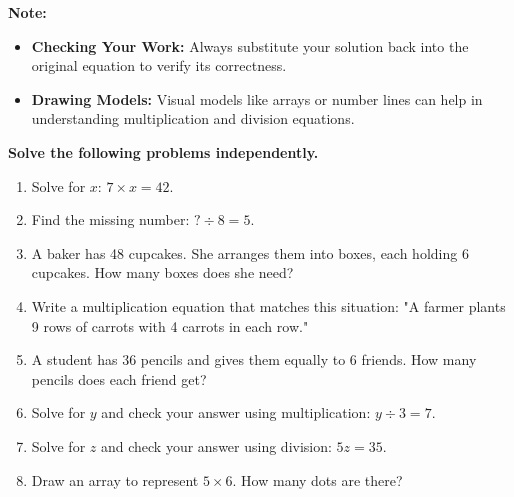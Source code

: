 \documentclass[11pt]{article}
\begin{document}
\vspace{1em}

\begin{tcolorbox}[colframe=black!40, colback=gray!5, 
coltitle=black, colbacktitle=black!20, fonttitle=\bfseries\Large, 
title=Additional Notes, halign title=center, left=5pt, right=5pt, top=5pt, bottom=15pt]
\textbf{Note:}
\begin{itemize}
    \item \textbf{Checking Your Work:} Always substitute your solution back into the original equation to verify its correctness.
    \item \textbf{Drawing Models:} Visual models like arrays or number lines can help in understanding multiplication and division equations.
\end{itemize}
\end{tcolorbox}

\vspace{1em}
\begin{tcolorbox}[colframe=black!60, colback=white, 
coltitle=black, colbacktitle=black!15, fonttitle=\bfseries\Large, 
    title=Independent Practice, halign title=center, left=10pt, right=10pt, top=10pt, bottom=60pt]
\textbf{Solve the following problems independently.}
\begin{enumerate}[itemsep=3em] %
    \item Solve for \( x \): \( 7 \times x = 42 \).
    
    \item Find the missing number: \( ? \div 8 = 5 \).
    
    \item A baker has 48 cupcakes. She arranges them into boxes, each holding 6 cupcakes. How many boxes does she need?
    
    \item Write a multiplication equation that matches this situation:  
    "A farmer plants 9 rows of carrots with 4 carrots in each row."
    
    \item A student has 36 pencils and gives them equally to 6 friends. How many pencils does each friend get?
    
    \item Solve for \( y \) and check your answer using multiplication: \( y \div 3 = 7 \).
    
    \item Solve for \( z \) and check your answer using division: \( 5z = 35 \).
    
    \item Draw an array to represent \( 5 \times 6 \). How many dots are there?
\end{enumerate}
\end{tcolorbox}
\end{document}
